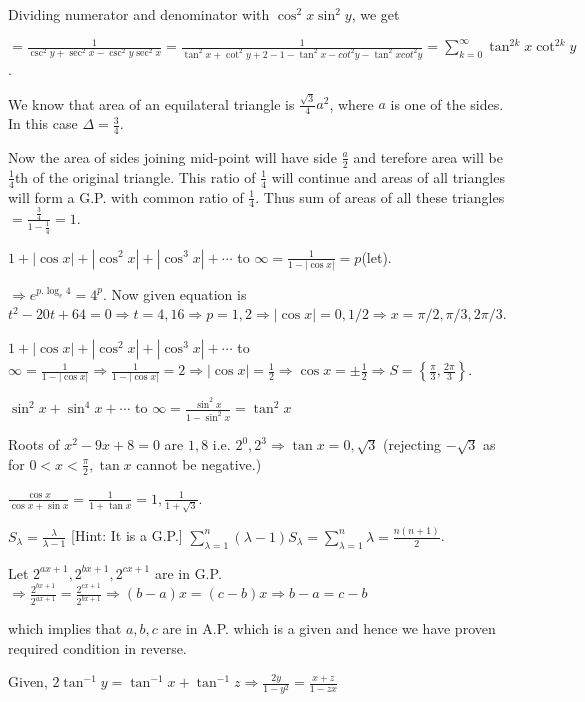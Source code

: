   Dividing numerator and denominator with $\cos^2x\sin^2y$, we get

  $= \frac{1}{\csc^2y + \sec^2x - \csc^2y\sec^2x} = \frac{1}{\tan^2x + \cot^2y + 2 - 1 -\tan^2x - cot^2y
    - \tan^2xcot^2y} = \displaystyle\sum_{k = 0}^{\infty}\tan^{2k}x\cot^{2k}y$.
\item We know that area of an equilateral triangle is $\frac{\sqrt{3}}{4}a^2$, where $a$ is one of the
  sides. In this case $\Delta = \frac{3}{4}$.

  Now the area of sides joining mid-point will have side $\frac{a}{2}$ and terefore area will be
  $\frac{1}{4}$th of the original triangle. This ratio of $\frac{1}{4}$ will continue and areas of all
  triangles will form a G.P. with common ratio of $\frac{1}{4}$. Thus sum of areas of all these triangles $=
  \frac{\tfrac{3}{4}}{1 - \tfrac{1}{4}} = 1$.
\item $1 + |\cos x| + |\cos^2x| + |\cos^3x| + \cdots$ to $\infty = \frac{1}{1 - |\cos x|} = p$(let).

  $\Rightarrow e^{p.\log_e4} = 4^p$. Now given equation is $t^2 - 20t + 64 = 0 \Rightarrow t = 4, 16
  \Rightarrow p = 1, 2 \Rightarrow |\cos x| = 0, 1/2 \Rightarrow x = \pi/2, \pi/3, 2\pi/3$.
\item $1 + |\cos x| + |\cos^2x| + |\cos^3x| + \cdots$ to $\infty = \frac{1}{1 - |\cos x|} \Rightarrow
  \frac{1}{1 - |\cos x|} = 2 \Rightarrow |\cos x| = \frac{1}{2}\Rightarrow \cos x = \pm\frac{1}{2}
  \Rightarrow S = \left\{\frac{\pi}{3}, \frac{2\pi}{3}\right\}$.
\item $\sin^2x + \sin^4x + \cdots$ to $\infty = \frac{\sin^2x}{1 - \sin^2x} = \tan^2x$

  Roots of $x^2 - 9x + 8 = 0$ are $1, 8$ i.e. $2^0, 2^3 \Rightarrow \tan x = 0, \sqrt{3}$ (rejecting
  $-\sqrt{3}$ as for $0< x< \frac{\pi}{2}, \tan x$  cannot be negative.)

  $\frac{\cos x}{\cos x + \sin x} = \frac{1}{1 + \tan x} = 1, \frac{1}{1 + \sqrt{3}}$.
\item $S_\lambda = \frac{\lambda}{\lambda - 1}$ [Hint: It is a G.P.]
  $\displaystyle\sum_{\lambda=1}^n(\lambda - 1)S_\lambda = \sum_{\lambda=1}^n\lambda = \frac{n(n + 1)}{2}$.
\item Let $2^{ax + 1}, 2^{bx + 1}, 2^{cx + 1}$ are in G.P. $\Rightarrow \frac{2^{bx + 1}}{2^{ax + 1}} =
  \frac{2^{cx + 1}}{2^{bx + 1}} \Rightarrow (b - a)x = (c - b)x \Rightarrow b - a = c - b$

  which implies that $a, b, c$ are in A.P. which is a given and hence we have proven required condition in
  reverse.
\item Given, $2\tan^{-1}y = \tan^{-1}x + \tan^{-1}z \Rightarrow \frac{2y}{1 - y^2} = \frac{x + z}{1 - zx}$

